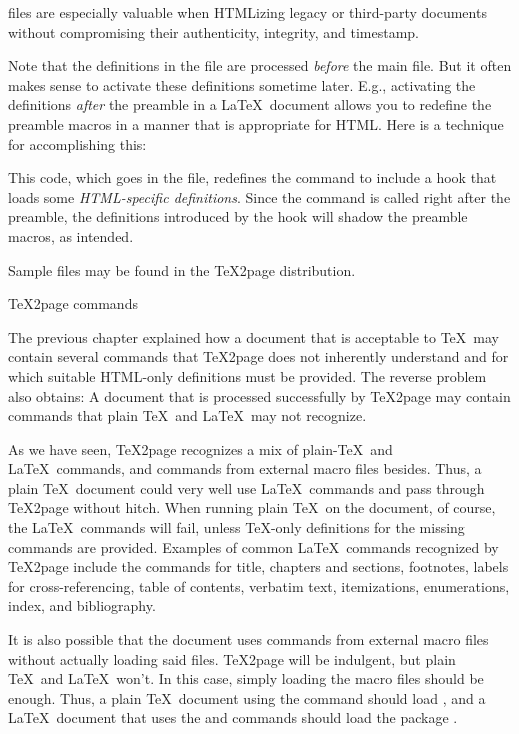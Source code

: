  files are especially valuable when HTMLizing
legacy or third-party documents without compromising
their authenticity, integrity, and timestamp.

Note that the definitions in the  file
are processed {\em before} the main file.  But it often
makes sense to activate these definitions sometime
later.  E.g., activating the  definitions {\em
after} the preamble in a \LaTeX\ document allows you to
redefine the preamble macros in a manner that is
appropriate for HTML.  Here is a technique for
accomplishing this:

%

\n This code, which goes in the  file,
redefines the \p{\document} command to include a
hook that loads some {\em HTML-specific definitions}.
Since the \p{\document} command is called right after
the preamble, the definitions introduced by  the hook
will shadow the preamble macros, as intended.

Sample  files may be found in the \TeX2page
distribution.

  \TeX2page commands

The previous chapter explained how a document that is
acceptable to \TeX\ may contain several commands that
\TeX2page does not inherently
understand and for which suitable HTML-only definitions
must be provided.  The reverse problem also obtains: A
document that is processed successfully by \TeX2page
may contain commands that plain \TeX\ and \LaTeX\ may not
recognize.

As we have seen, \TeX2page recognizes a mix of plain-\TeX\ and \LaTeX\
commands, and commands from external macro files besides.
Thus,
a plain \TeX\ document could very well use \LaTeX\
commands and pass through \TeX2page without hitch.  When
running plain \TeX\ on the document, of course, the \LaTeX\
commands will fail, unless \TeX-only definitions for the
missing commands are provided.  Examples of common \LaTeX\
commands recognized by \TeX2page include the commands for
title, chapters and sections, footnotes,  labels for
cross-referencing, table of contents,  verbatim text,
itemizations, enumerations,
index, and bibliography.

It is also possible that the
document uses commands from external macro files
without actually loading said files.  \TeX2page will be
indulgent, but plain \TeX\ and \LaTeX\ won’t.
In this case,
simply loading the macro files should be
enough.    Thus, a plain \TeX\ document using the \p{\cite}
command should load \p{btxmac.tex}, and   a \LaTeX\ document that uses
the \p{\color} and \p{\definecolor} commands should load the package
\p{color.sty}.

